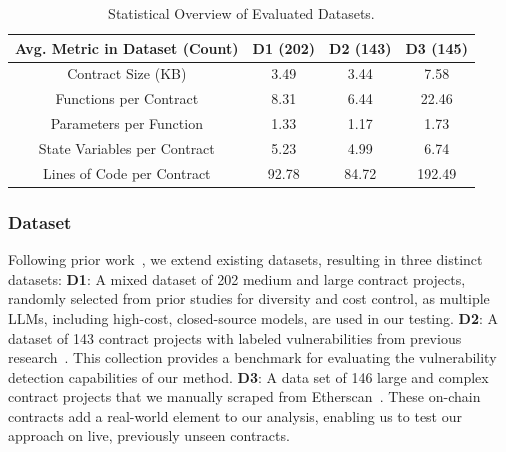 \documentclass[sigconf]{acmart}
\begin{document}
\begin{sloppypar}
\begin{table}[h]
\vspace{-5pt}
\centering
\caption{\small Statistical Overview of Evaluated Datasets.}
\vspace{-10pt}
\label{tab:statistical}
{\fontsize{8.5}{10.5}\selectfont %
\setlength{\tabcolsep}{3pt}%
\renewcommand{\arraystretch}{0.9}%
\begin{tabular}{cccc}
\toprule
\textbf{Avg. Metric in Dataset (Count)} & \textbf{D1 (202)} & \textbf{D2 (143)} & \textbf{D3 (145)} \\ 
\midrule
Contract Size (KB)      & 3.49  & 3.44  & 7.58  \\
Functions per Contract  & 8.31  & 6.44  & 22.46 \\
Parameters per Function & 1.33  & 1.17  & 1.73  \\
State Variables per Contract         & 5.23  & 4.99  & 6.74  \\
Lines of Code per Contract           & 92.78 & 84.72 & 192.49 \\ 
\bottomrule
\end{tabular}
}
\vspace{-10pt}
\end{table}




\vspace{-3pt}
\subsubsection{Dataset}
Following prior work~\cite{torres2021confuzzius, ase2020smartbugs, liu2023rethinking}, we extend existing datasets, resulting in three distinct datasets:
%
\textbf{D1}: A mixed dataset of 202 medium and large contract projects, randomly selected from prior studies for diversity and cost control, as multiple LLMs, including high-cost, closed-source models, are used in our testing.
\textbf{D2}: A dataset of 143 contract projects with labeled vulnerabilities from previous research~\cite{ase2020smartbugs}. This collection provides a benchmark for evaluating the vulnerability detection capabilities of our method.
\textbf{D3}: A data set of 146 large and complex contract projects that we manually scraped from Etherscan~\cite{EtherscanWebsite}. These on-chain contracts add a real-world element to our analysis, enabling us to test our approach on live, previously unseen contracts.
%






\end{sloppypar}
\end{document}
